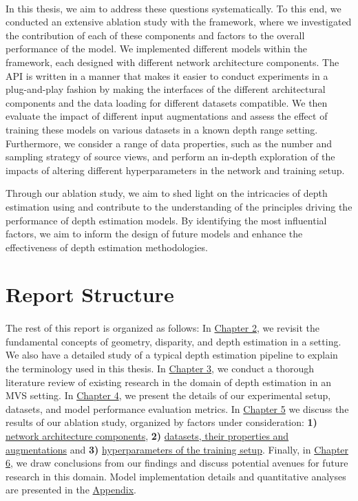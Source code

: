     \paragraph{}In this thesis, we aim to address these questions systematically. To this end, we conducted an extensive ablation study with the {\rmvd} framework, where we investigated the contribution of each of these components and factors to the overall performance of the model. We implemented different models within the {\rmvd} framework, each designed with different network architecture components. The API is written in a manner that makes it easier to conduct experiments in a plug-and-play fashion by making the interfaces of the different architectural components and the data loading for different datasets compatible. We then evaluate the impact of different input augmentations and assess the effect of training these models on various datasets in a known depth range setting. Furthermore, we consider a range of data properties, such as the number and sampling strategy of source views, and perform an in-depth exploration of the impacts of altering different hyperparameters in the network and training setup.\par
    Through our ablation study, we aim to shed light on the intricacies of depth estimation using {\mvs} and contribute to the understanding of the principles driving the performance of {\mv} depth estimation models. By identifying the most influential factors, we aim to inform the design of future models and enhance the effectiveness of depth estimation methodologies. 

\section{Report Structure}\label{sec:Report Structure}
    \paragraph{}The rest of this report is organized as follows: In \hyperref[chap:background]{Chapter 2}, we revisit the fundamental concepts of {\mv} geometry, disparity, and depth estimation in a {\mv} setting. We also have a detailed study of a typical {\mvs} depth estimation pipeline to explain the terminology used in this thesis. In \hyperref[chap:relatedwork]{Chapter 3}, we conduct a thorough literature review of existing research in the domain of depth estimation in an MVS setting. In \hyperref[chap:approach]{Chapter 4}, we present the details of our experimental setup, datasets, and model performance evaluation metrics. In \hyperref[chap:experiments]{Chapter 5} we discuss the results of our ablation study, organized by factors under consideration: \textbf{1)} \hyperref[sec:exp-arch]{network architecture components}, \textbf{2)} \hyperref[sec:exp-dataset-prop]{datasets, their properties and augmentations} and \textbf{3)} \hyperref[sec:exp-hyper]{hyperparameters of the training setup}. Finally, in \hyperref[chap:conclusion]{Chapter 6}, we draw conclusions from our findings and discuss potential avenues for future research in this domain. Model implementation details and quantitative analyses are presented in the \hyperref[chap:appendix]{Appendix}.


